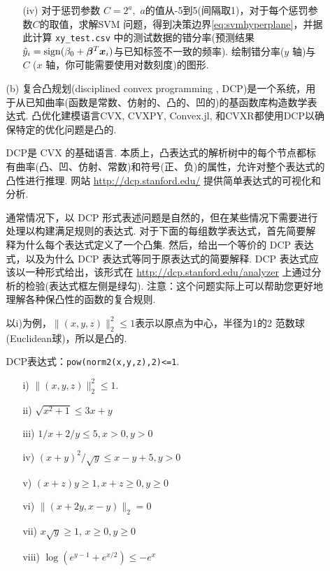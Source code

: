 \documentclass[a4paper,12pt]{ctexart}
\newcommand\gb{\bm \beta}
\newcommand\bx{{\bm x}}
\begin{document}
\begin{enumerate}
\begin{enumerate}
\begin{enumerate}
\item [(iv)]  对于惩罚参数 $C=2^a$,\ $a$的值从-5到5(间隔取1)，对于每个惩罚参数$C$的取值，求解SVM 问题，得到决策边界\eqref{eq:svmhyperplane}，并据此计算 {\tt xy\_test.csv} 中的测试数据的错分率(预测结果$\hat y_i={\rm sign}(\beta_0 + \gb^T \bx_i)$与已知标签不一致的频率). 绘制错分率($y$ 轴)与 $C$ ($x$ 轴，你可能需要使用对数刻度)的图形.
\end{enumerate}

\item[(b)] 复合凸规划(disciplined convex programming , DCP)是一个系统，用于从已知曲率(函数是常数、仿射的、凸的、凹的)的基函数库构造数学表达式.  凸优化建模语言CVX, CVXPY, Convex.jl, 和CVXR都使用DCP以确保特定的优化问题是凸的.

    DCP是 CVX 的基础语言. 本质上，凸表达式的解析树中的每个节点都标有曲率(凸、凹、仿射、常数)和符号(正、负)的属性，允许对整个表达式的凸性进行推理. 网站 \url{http://dcp.stanford.edu/} 提供简单表达式的可视化和分析.

通常情况下，以 DCP 形式表述问题是自然的，但在某些情况下需要进行处理以构建满足规则的表达式. 对于下面的每组数学表达式，首先简要解释为什么每个表达式定义了一个凸集. 然后，给出一个等价的 DCP 表达式，以及为什么 DCP 表达式等同于原表达式的简要解释.  DCP 表达式应该以一种形式给出，该形式在 \url{http://dcp.stanford.edu/analyzer} 上通过分析的检验(表达式框左侧是绿勾). 注意：这个问题实际上可以帮助您更好地理解各种保凸性的函数的复合规则.

以i)为例，$\|(x, y, z)\|_2^2 \le 1$表示以原点为中心，半径为1的2 范数球(Euclidean球)，所以是凸的.

 DCP表达式：\verb"pow(norm2(x,y,z),2)<=1".

\begin{enumerate}
\item[i)] $\|(x, y, z)\|_2^2 \le 1$.
\item[ii)] $\sqrt{x^2 + 1} \le 3x + y$
\item[iii)] $1/x + 2/y \le 5,  x > 0, y > 0$
\item[iv)] $(x+y)^2/\sqrt{y} \le x - y + 5, y > 0$
\item [v)] $(x+z)y \ge 1, x+z \ge 0, y \ge 0$
\item[vi)] $\|(x + 2y, x-y)\|_2 = 0$
\item[vii)] $x\sqrt{y} \ge 1$, $x \ge 0, y \ge 0$
\item[viii)] $\log(e^{y-1} + e^{x/2}) \le -e^x $
\end{enumerate}
\end{enumerate}



\end{enumerate}
\end{document}
